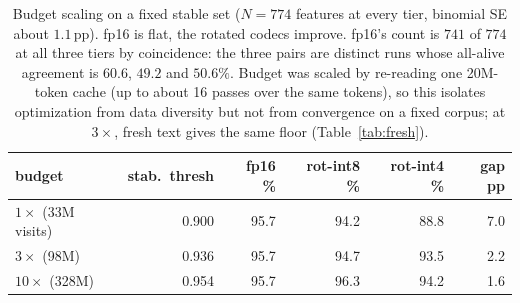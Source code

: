 \begin{table}[htbp]
\caption{Budget scaling on a fixed stable set ($N = 774$ features at every tier, binomial SE about $1.1$\,pp). fp16 is flat, the rotated codecs improve. fp16's count is $741$ of $774$ at all three tiers by coincidence: the three pairs are distinct runs whose all-alive agreement is $60.6$, $49.2$ and $50.6\%$. Budget was scaled by re-reading one 20M-token cache (up to about 16 passes over the same tokens), so this isolates optimization from data diversity but not from convergence on a fixed corpus; at $3\times$, fresh text gives the same floor (Table~\ref{tab:fresh}).}
\label{tab:budget}
\centering\small
\begin{tabular}{lrrrrr}
\toprule
budget & stab.\ thresh & fp16 \% & rot-int8 \% & rot-int4 \% & gap pp \\
\midrule
$1\times$ (33M visits) & 0.900 & 95.7 & 94.2 & 88.8 & 7.0 \\
$3\times$ (98M) & 0.936 & 95.7 & 94.7 & 93.5 & 2.2 \\
$10\times$ (328M) & 0.954 & 95.7 & 96.3 & 94.2 & 1.6 \\
\bottomrule
\end{tabular}
\end{table}

